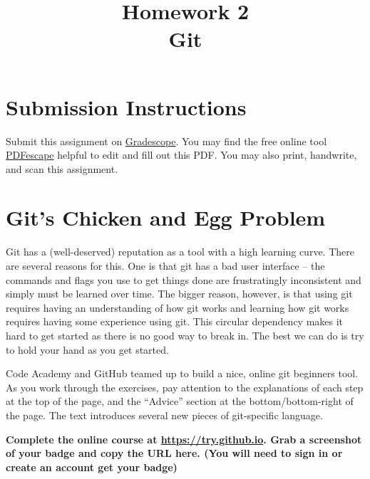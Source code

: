 \documentclass{article}
\begin{document}
\fancyhead[L]{}
\fancyhead[R]{}

\fancyfoot[C]{\thepage~/~\pageref*{LastPage}}
\pagestyle{fancyplain}


\title{\textbf{Homework 2\\Git}}
\author{\textbf{\color{red}{Due: Saturday, September 24, 10:00PM (Hard Deadline)}}}
\date{}
\maketitle


\section*{Submission Instructions}
Submit this assignment on \href{https://gradescope.com/courses/3499}{Gradescope}.
You may find the free online tool \href{https://www.pdfescape.com}{PDFescape}
helpful to edit and fill out this PDF.
You may also print, handwrite, and scan this assignment.

\section{Git's Chicken and Egg Problem}

Git has a (well-deserved) reputation as a tool with a high learning curve.
There are several reasons for this. One is that git has a bad user interface
-- the commands and flags you use to get things done are frustratingly
inconsistent and simply must be learned over time.
The bigger reason, however, is that using git requires having an understanding
of how git works and learning how git works requires having some experience
using git. This circular dependency makes it hard to get started as there is
no good way to break in. The best we can do is try to hold your hand as you
get started.

\medskip
\noindent
Code Academy and GitHub teamed up to build a nice, online git beginners tool.
As you work through the exercises, pay attention to the explanations of each
step at the top of the page, and the ``Advice'' section at the
bottom/bottom-right of the page. The text introduces several new pieces of
git-specific language.

\medskip
\noindent
\textbf{Complete the online course at \url{https://try.github.io}. Grab a
  screenshot of your badge and copy the URL here.
  {\small (You will need to sign in or create an account get your badge)}
}
\end{document}
